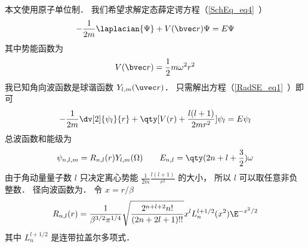 
\begin{issues}
\issueDraft
\end{issues}


本文使用原子单位制． 我们希望求解定态薛定谔方程（\autoref{SchEq_eq4}~）
\begin{equation}
-\frac{1}{2m} \laplacian {\Psi} + V(\bvec r)\Psi = E \Psi
\end{equation}
其中势能函数为
\begin{equation}
V(\bvec r) = \frac{1}{2}m\omega^2 r^2
\end{equation}
我已知角向波函数是球谐函数 $Y_{l,m}(\uvec r)$． 只需解出方程（\autoref{RadSE_eq1}~）即可
\begin{equation}
-\frac{1}{2m} \dv[2]{\psi_l}{r} + \qty[V(r) + \frac{l(l + 1)}{2mr^2}]\psi_l = E\psi_l
\end{equation}
总波函数和能级为
\begin{equation}
\psi_{n,l,m} = R_{n,l}(r) Y_{l,m}(\Omega)
\qquad
E_{n,l} = \qty(2n + l + \frac32) \omega
\end{equation}    
由于角动量量子数 $l$ 只决定离心势能 $\frac{1}{2m} \frac{l(l + 1)}{r^2}$  的大小， 所以 $l$ 可以取任意非负整数． 径向波函数为． 令 $x = r/\beta $
\begin{equation}
R_{n,l}(r) = \frac{1}{\beta^{3/2} \pi^{1/4}} \sqrt{\frac{2^{n+l+2} n!}{(2n + 2l + 1)!!}} x^l L_n^{l+1/2}(x^2) \E^{-x^2/2}
\end{equation}
其中 $L_n^{l+1/2}$ 是连带拉盖尔多项式．

